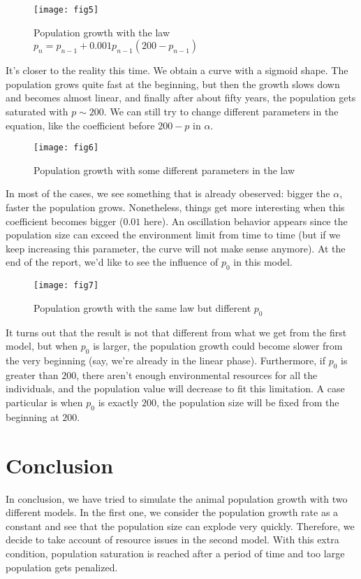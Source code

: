 \vspace{-1em}
\begin{figure}[H]
  \centering
  \texttt{[image: fig5]}
  \caption{Population growth with the law 
           $p_n = p_{n-1} + 0.001p_{n-1}(200 - p_{n-1})$}
\end{figure}

It's closer to the reality this time. We obtain a curve with a sigmoid 
shape. The population grows quite fast at the beginning, but then 
the growth slows down and becomes almost linear, and finally after about
fifty years, the population gets saturated with $p \sim 200$. We can still
try to change different parameters in the equation, like the coefficient
before $200-p$ in $\alpha$.

\vspace{-1em}
\begin{figure}[H]
  \centering
  \texttt{[image: fig6]}
  \caption{Population growth with some different parameters in the law}
\end{figure}

In most of the cases, we see something that is already obeserved: bigger the 
$\alpha$, faster the population grows. Nonetheless, things get more 
interesting when this coefficient becomes bigger ($0.01$ here). An oscillation
behavior appears since the population size can exceed the environment limit
from time to time (but if we keep increasing this parameter, the curve will 
not make sense anymore). At the end of the report, we'd like to see the 
influence of $p_0$ in this model.

\vspace{-1em}
\begin{figure}[H]
  \centering
  \texttt{[image: fig7]}
  \caption{Population growth with the same law but different $p_0$}
\end{figure}

It turns out that the result is not that different from what we get from
the first model, but when $p_0$ is larger, the population growth could
become slower from the very beginning (say, we're already in the linear
phase). Furthermore, if $p_0$ is greater than $200$, there aren't 
enough environmental resources for all the individuals, and the
population value will decrease to fit this limitation. A case particular
is when $p_0$ is exactly $200$, the population size will be fixed
from the beginning at $200$.

\section{Conclusion}

In conclusion, we have tried to simulate the animal population growth with
two different models. In the first one, we consider the population growth
rate as a constant and see that the population size can explode very
quickly. Therefore, we decide to take account of resource issues in the
second model. With this extra condition, population saturation is reached
after a period of time and too large population gets penalized.
